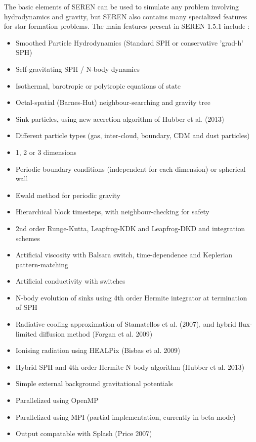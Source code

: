 \documentclass[a4paper]{article}
\newcommand{\VERNO}{1.5.1 }
\begin{document}
The basic elements of SEREN can be used to simulate any problem involving hydrodynamics and gravity, but SEREN also contains many specialized features for star formation problems.  The main features present in SEREN \VERNO  include : 
\begin{itemize}
\item Smoothed Particle Hydrodynamics (Standard SPH or conservative 'grad-h' SPH)
\item Self-gravitating SPH / N-body dynamics
\item Isothermal, barotropic or polytropic equations of state
\item Octal-spatial (Barnes-Hut) neighbour-searching and gravity tree
\item Sink particles, using new accretion algorithm of Hubber et al. (2013)
\item Different particle types (gas, inter-cloud, boundary, CDM and dust particles)
\item 1, 2 or 3 dimensions
\item Periodic boundary conditions (independent for each dimension) or spherical wall
\item Ewald method for periodic gravity
\item Hierarchical block timesteps, with neighbour-checking for safety
\item 2nd order Runge-Kutta, Leapfrog-KDK and Leapfrog-DKD and integration schemes
\item Artificial viscosity with Balsara switch, time-dependence and Keplerian pattern-matching
\item Artificial conductivity with switches
\item N-body evolution of sinks using 4th order Hermite integrator at termination of SPH
\item Radiative cooling approximation of Stamatellos et al. (2007), and hybrid flux-limited diffusion method (Forgan et al. 2009)
\item Ionising radiation using HEALPix (Bisbas et al. 2009)
\item Hybrid SPH and 4th-order Hermite N-body algorithm (Hubber et al. 2013)
\item Simple external background gravitational potentials
\item Parallelized using OpenMP
\item Parallelized using MPI (partial implementation, currently in beta-mode)
\item Output compatable with Splash (Price 2007)
\end{itemize}
\end{document}
